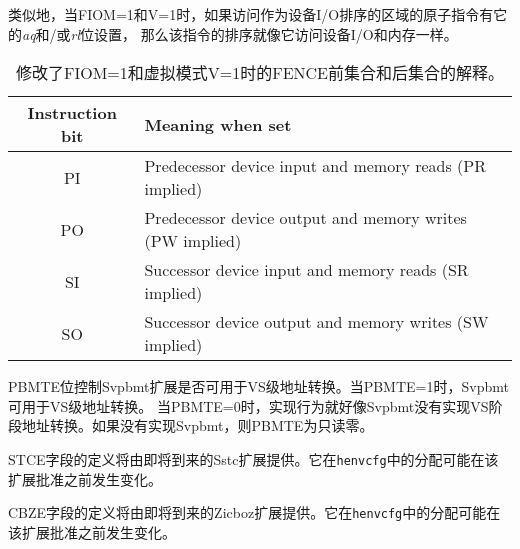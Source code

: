 类似地，当FIOM=1和V=1时，如果访问作为设备I/O排序的区域的原子指令有它的{\em aq}和/或{\em rl}位设置，
那么该指令的排序就像它访问设备I/O和内存一样。

\begin{table}[h!]
\begin{center}
\begin{tabular}{|c|l|}
\hline
Instruction bit & Meaning when set \\
\hline
PI & Predecessor device input and memory reads   (PR implied) \\
PO & Predecessor device output and memory writes (PW implied) \\
\hline
SI & Successor device input and memory reads     (SR implied) \\
SO & Successor device output and memory writes   (SW implied) \\
\hline
\end{tabular}
\end{center}
\vspace{-0.1in}
\caption{%
修改了FIOM=1和虚拟模式V=1时的FENCE前集合和后集合的解释。
}
\label{tab:henvcfg-FIOM}
\end{table}

PBMTE位控制Svpbmt扩展是否可用于VS级地址转换。当PBMTE=1时，Svpbmt可用于VS级地址转换。
当PBMTE=0时，实现行为就好像Svpbmt没有实现VS阶段地址转换。如果没有实现Svpbmt，则PBMTE为只读零。

STCE字段的定义将由即将到来的Sstc扩展提供。它在{\tt henvcfg}中的分配可能在该扩展批准之前发生变化。

CBZE字段的定义将由即将到来的Zicboz扩展提供。它在{\tt henvcfg}中的分配可能在该扩展批准之前发生变化。

